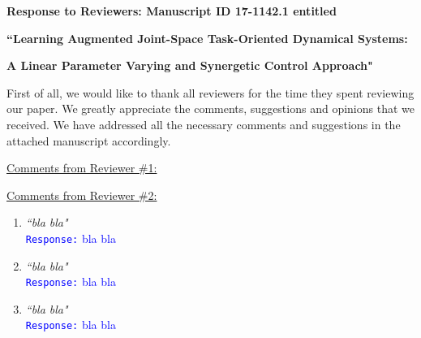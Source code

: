 \documentclass[10pt,stdletter,dateno]{newlfm}
\begin{document}
\begin{newlfm}
\vspace{-2in}
\centerline{\textbf{Response to Reviewers: Manuscript ID 17-1142.1 entitled}} \centerline{\textbf{``Learning Augmented Joint-Space Task-Oriented Dynamical Systems:}}
\centerline{\textbf{A Linear Parameter Varying and Synergetic Control Approach" }}
First of all, we would like to thank all reviewers for the time they spent reviewing our paper. We greatly appreciate the comments, suggestions and opinions that we received. We have addressed all the necessary comments and suggestions in the attached manuscript accordingly. 

\underline{Comments from Reviewer \#1:}

\underline{Comments from Reviewer \#2:}
\begin{enumerate}
\item \textit{``bla bla"}\\
\textcolor{blue}{\texttt{Response:} \small bla bla}\\

\item \textit{``bla bla"}\\
\textcolor{blue}{\texttt{Response:} \small bla bla}\\

\item \textit{``bla bla"}\\
\textcolor{blue}{\texttt{Response:} \small bla bla}\\



\end{enumerate}
\end{newlfm}
\end{document}
